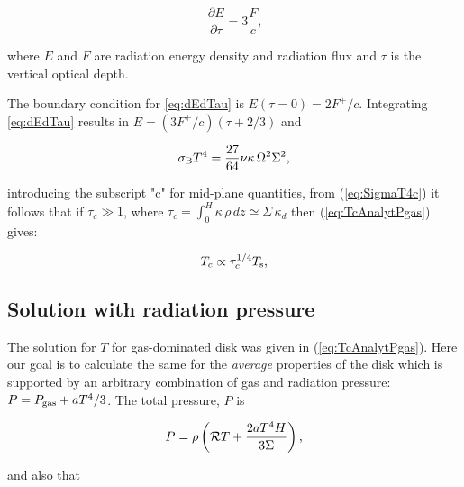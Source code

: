 \documentclass[12pt,english,preprint]{aastex}
\newcommand{\su}[2]{#1_{\rm #2}}
\newcommand{\Tc}{T}
\begin{document}
\begin{equation}
\frac{\partial E}{\partial\tau}=3\frac{F}{c}\mbox{,}\label{eq:dEdTau}
\end{equation}

\noindent where $E$ and $F$ are radiation energy density and radiation flux
and $\tau$ is the vertical optical depth. 

The boundary condition for \eqref{eq:dEdTau} is $E(\tau=0)=2F^+/c$. 
Integrating \eqref{eq:dEdTau} results in $E=(3F^+/c)(\tau+2/3)$ and

\begin{equation}\label{eq:SigmaT4c}
  \su{\sigma}{B}T^4 = \frac{27}{64}\nu\kappa\,\Omega^2\Sigma^2\mbox{,} 
\end{equation} 

\noindent introducing the subscript "c" for mid-plane quantities, 
from (\ref{eq:SigmaT4c}) it follows that if $\tau_{c}\gg1$, 
where 
${\displaystyle
\tau_c = \int_{0}^{H}\kappa \, \rho \,dz\simeq \Sigma \, \kappa_d }$
then (\ref{eq:TcAnalytPgas}) gives: 

\begin{equation}
T_c\propto\tau_{c}^{1/4}T_{{\rm s}}\mbox{,}\label{eq:TcTauc}
\end{equation}


\subsection{Solution with radiation pressure }\label{sec:SolWithRadPressure}



The solution for $\Tc$ for gas-dominated disk
was given in (\ref{eq:TcAnalytPgas}). Here our goal is to
calculate the same for the {\it average} properties of the disk which is 
supported by an arbitrary combination
of gas and radiation pressure: $P=P_{{\rm gas}}+aT^{4}/3$. 
The total pressure, $P$ is 


\begin{equation}
P=\rho\left({\cal R}T+\frac{2aT^{4}H}{3\Sigma}\right)\mbox{,}\label{eq:nuAlphaPtot}
\end{equation}

\noindent and also that
\end{document}
